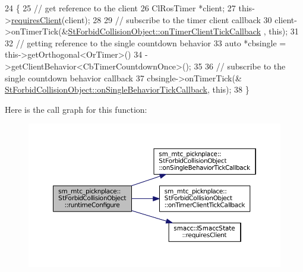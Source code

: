 \begin{DoxyCode}
24     \{
25         \textcolor{comment}{// get reference to the client}
26         ClRosTimer *client;
27         this->\hyperlink{classsmacc_1_1ISmaccState_a7f95c9f0a6ea2d6f18d1aec0519de4ac}{requiresClient}(client);
28 
29         \textcolor{comment}{// subscribe to the timer client callback}
30         client->onTimerTick(&\hyperlink{structsm__mtc__picknplace_1_1StForbidCollisionObject_a43f903fa4f881600ab1b7f2ee29ec457}{StForbidCollisionObject::onTimerClientTickCallback}
      , \textcolor{keyword}{this});
31 
32         \textcolor{comment}{// getting reference to the single countdown behavior}
33         \textcolor{keyword}{auto} *cbsingle = this->getOrthogonal<OrTimer>()
34                              ->getClientBehavior<CbTimerCountdownOnce>();
35 
36         \textcolor{comment}{// subscribe to the single countdown behavior callback}
37         cbsingle->onTimerTick(&
      \hyperlink{structsm__mtc__picknplace_1_1StForbidCollisionObject_a79af36073b89e9209706122a4e96468c}{StForbidCollisionObject::onSingleBehaviorTickCallback},
       \textcolor{keyword}{this});
38     \}
\end{DoxyCode}


Here is the call graph for this function\+:
\nopagebreak
\begin{figure}[H]
\begin{center}
\leavevmode
\includegraphics[width=350pt]{structsm__mtc__picknplace_1_1StForbidCollisionObject_adfcf7e4de51f35ceb4daa168d15c675c_cgraph}
\end{center}
\end{figure}


